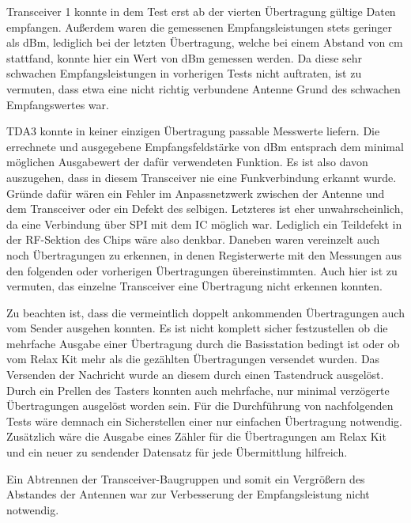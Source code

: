 Transceiver 1 konnte in dem Test erst ab der vierten Übertragung gültige Daten empfangen. Außerdem waren die gemessenen Empfangsleistungen stets geringer als \unit[-100]{dBm}, lediglich  bei der letzten Übertragung, welche bei einem Abstand von \unit[30]{cm} stattfand, konnte hier ein Wert von \unit[-97]{dBm} gemessen werden. Da diese  sehr schwachen Empfangsleistungen in vorherigen Tests nicht auftraten, ist zu vermuten, dass etwa eine nicht richtig verbundene Antenne  Grund des schwachen Empfangswertes war.

TDA3 konnte in keiner einzigen Übertragung passable Messwerte liefern. Die errechnete und ausgegebene Empfangsfeldstärke von \unit[-114]{dBm} entsprach dem minimal möglichen Ausgabewert der dafür verwendeten Funktion. Es ist also davon auszugehen, dass in diesem Transceiver nie eine Funkverbindung erkannt wurde. Gründe dafür wären ein Fehler im Anpassnetzwerk zwischen der Antenne und dem Transceiver oder ein Defekt des selbigen. Letzteres ist eher unwahrscheinlich, da eine Verbindung über \ac{SPI} mit dem \ac{IC} möglich war. Lediglich ein Teildefekt  in der RF-Sektion des Chips wäre also denkbar.
Daneben waren vereinzelt auch noch Übertragungen zu erkennen, in denen Registerwerte mit den Messungen aus den folgenden oder vorherigen Übertragungen übereinstimmten. Auch hier ist zu vermuten, das einzelne Transceiver eine Übertragung nicht erkennen konnten. 


Zu beachten ist, dass die vermeintlich doppelt ankommenden Übertragungen auch vom Sender ausgehen konnten. Es ist nicht komplett sicher festzustellen ob die mehrfache Ausgabe einer Übertragung durch die Basisstation  bedingt ist oder ob vom Relax Kit mehr als die gezählten Übertragungen versendet wurden. Das Versenden der Nachricht wurde an diesem durch einen Tastendruck ausgelöst.  Durch ein Prellen des Tasters konnten auch mehrfache, nur minimal verzögerte Übertragungen ausgelöst worden sein.
Für die Durchführung von nachfolgenden Tests wäre demnach ein Sicherstellen einer nur einfachen Übertragung notwendig. Zusätzlich wäre die Ausgabe eines Zähler für die Übertragungen am Relax Kit und ein neuer zu sendender Datensatz für jede Übermittlung hilfreich.

Ein Abtrennen der Transceiver-Baugruppen und somit ein Vergrößern des Abstandes der Antennen war zur Verbesserung der Empfangsleistung nicht notwendig.